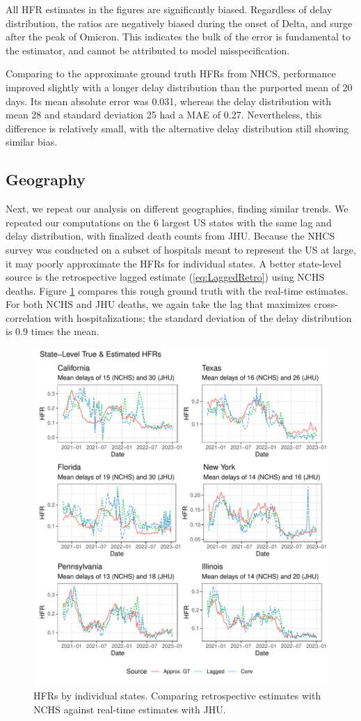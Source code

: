 \documentclass{article}
\begin{document}
All HFR estimates in the figures are significantly biased. Regardless of delay distribution, the ratios are negatively biased during the onset of Delta, and surge after the peak of Omicron. This indicates the bulk of the error is fundamental to the estimator, and cannot be attributed to model misspecification. 

Comparing to the approximate ground truth HFRs from NHCS, performance improved slightly with a longer delay distribution than the purported mean of 20 days. Its mean absolute error was 0.031, whereas the delay distribution with mean 28 and standard deviation 25 had a MAE of 0.27. Nevertheless, this difference is relatively small, with the alternative delay distribution still showing similar bias.

\subsection{Geography}

Next, we repeat our analysis on different geographies, finding similar trends. We repeated our computations on the 6 largest US states with the same lag and delay distribution, with finalized death counts from JHU. Because the NHCS survey was conducted on a subset of hospitals meant to represent the US at large, it may poorly approximate the HFRs for individual states. A better state-level source is the retrospective lagged estimate (\ref{eq:LaggedRetro}) using NCHS deaths. Figure \ref{fig:state-level} compares this rough ground truth with the real-time estimates. For both NCHS and JHU deaths, we again take the lag that maximizes cross-correlation with hospitalizations; the standard deviation of the delay distribution is 0.9 times the mean. 

 \begin{figure}
     \centering
     \includegraphics[width=0.8\linewidth]{Figs/Real/state_level_hfrs.pdf}
     \caption{HFRs by individual states. Comparing retrospective estimates with NCHS against real-time estimates with JHU.}
     \label{fig:state-level}
 \end{figure}
\end{document}
